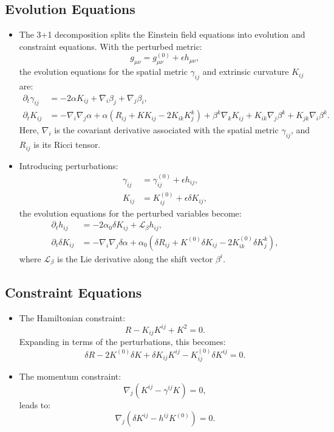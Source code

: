 \documentclass[12pt]{article}
\begin{document}
\subsection{Evolution Equations}
\begin{itemize}
    \item The 3+1 decomposition splits the Einstein field equations into evolution and constraint equations. With the perturbed metric:
    \[
    g_{\mu\nu} = g_{\mu\nu}^{(0)} + \epsilon h_{\mu\nu},
    \]
    the evolution equations for the spatial metric $\gamma_{ij}$ and extrinsic curvature $K_{ij}$ are:
    \begin{align}
        \partial_t \gamma_{ij} &= -2\alpha K_{ij} + \nabla_i \beta_j + \nabla_j \beta_i, \\
        \partial_t K_{ij} &= -\nabla_i \nabla_j \alpha + \alpha (R_{ij} + K K_{ij} - 2K_{ik}K^k_j) + \beta^k \nabla_k K_{ij} + K_{ik} \nabla_j \beta^k + K_{jk} \nabla_i \beta^k.
    \end{align}
    Here, $\nabla_i$ is the covariant derivative associated with the spatial metric $\gamma_{ij}$, and $R_{ij}$ is its Ricci tensor.
    \item Introducing perturbations:
    \begin{align*}
        \gamma_{ij} &= \gamma_{ij}^{(0)} + \epsilon h_{ij}, \\
        K_{ij} &= K_{ij}^{(0)} + \epsilon \delta K_{ij},
    \end{align*}
    the evolution equations for the perturbed variables become:
    \begin{align}
        \partial_t h_{ij} &= -2 \alpha_0 \delta K_{ij} + \mathcal{L}_\beta h_{ij}, \\
        \partial_t \delta K_{ij} &= -\nabla_i \nabla_j \delta\alpha + \alpha_0 \left( \delta R_{ij} + K^{(0)} \delta K_{ij} - 2 K_{ik}^{(0)} \delta K^k_j \right),
    \end{align}
    where $\mathcal{L}_\beta$ is the Lie derivative along the shift vector $\beta^i$.

\end{itemize}

\subsection{Constraint Equations}
\begin{itemize}
    \item The Hamiltonian constraint:
    \[
    R - K_{ij}K^{ij} + K^2 = 0.
    \]
    Expanding in terms of the perturbations, this becomes:
    \[
    \delta R - 2 K^{(0)} \delta K + \delta K_{ij} K^{ij} - K_{ij}^{(0)} \delta K^{ij} = 0.
    \]
    \item The momentum constraint:
    \[
    \nabla_j (K^{ij} - \gamma^{ij} K) = 0,
    \]
    leads to:
    \[
    \nabla_j (\delta K^{ij} - h^{ij} K^{(0)}) = 0.
    \]
\end{itemize}
\end{document}
